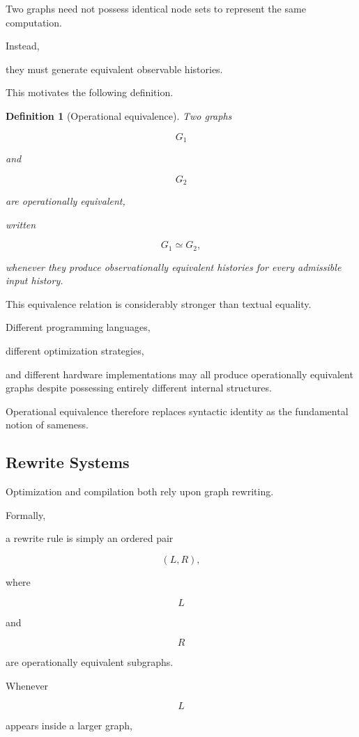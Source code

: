 \documentclass[12pt,oneside]{article}
\newtheorem{definition}{Definition}[section]
\begin{document}
Two graphs need not possess identical node sets to represent the same computation.

Instead,

they must generate equivalent observable histories.

This motivates the following definition.

\begin{definition}[Operational equivalence]

Two graphs

\[
G_1
\]

and

\[
G_2
\]

are operationally equivalent,

written

\[
G_1
\simeq
G_2,
\]

whenever they produce observationally equivalent histories for every admissible input history.

\end{definition}

This equivalence relation is considerably stronger than textual equality.

Different programming languages,

different optimization strategies,

and different hardware implementations may all produce operationally equivalent graphs despite possessing entirely different internal structures.

Operational equivalence therefore replaces syntactic identity as the fundamental notion of sameness.

\subsection{Rewrite Systems}

Optimization and compilation both rely upon graph rewriting.

Formally,

a rewrite rule is simply an ordered pair

\[
(L,R),
\]

where

\[
L
\]

and

\[
R
\]

are operationally equivalent subgraphs.

Whenever

\[
L
\]

appears inside a larger graph,
\end{document}
